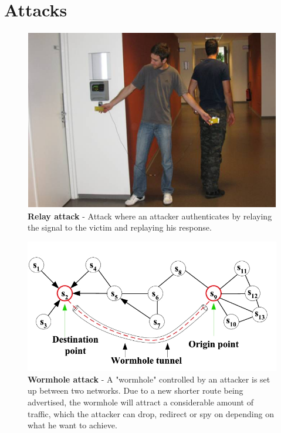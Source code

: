 \documentclass{article}
\begin{document}
\section{Attacks}
\begin{figure}[h!]
    \includegraphics{relay-attack}
    \caption{\textbf{Relay attack} - Attack where an attacker authenticates by relaying the signal to the victim and replaying his response\cite{thevenon13}.}
\end{figure}
\begin{figure}[h!]
    \includegraphics[width=1.0\textwidth]{wormhole-attack}
    \caption{\textbf{Wormhole attack} - A "wormhole" controlled by an attacker is set up between two networks. Due to a new shorter route being advertised, the wormhole will attract a considerable amount of traffic, which the attacker can drop, redirect or spy on depending on what he want to achieve\cite{infotec}.}
\end{figure}
\clearpage
\end{document}

